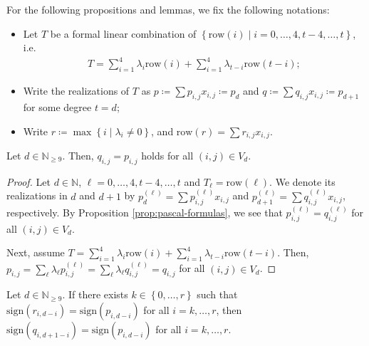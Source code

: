 For the following propositions and lemmas, we fix the following notations:
\begin{itemize}
    \item Let \( T \) be a formal linear combination of \( \left\{ \mathrm{row}(i) \mid i = 0, \dots, 4, t-4, \dots, t \right\} \), i.e. 
    \begin{align*}
        T = \sum_{i=1}^{4}  \lambda_{i} \mathrm{row}(i) + \sum_{i=1}^{4}  \lambda_{t-i} \mathrm{row}(t-i);
    \end{align*}
    \item Write the realizations of \( T \) as \( p \coloneqq \sum p_{i,j}x_{i,j}  \coloneqq p_d  \) and \( q \coloneqq \sum q_{i,j}x_{i,j} \coloneqq p_{d+1} \) for some degree \( t = d \);
    \item Write \( r \coloneqq \max\left\{ i \mid \lambda_i \neq 0 \right\} \), and \( \mathrm{row}(r) = \sum r_{i,j}x_{i,j} \).
\end{itemize}  

\begin{lemma}\label{prop:row_extend_d}
    Let \( d \in \mathbb{N}_{\geq 9} \). Then, \( q_{i,j} = p_{i,j} \) holds for all \( (i,j) \in V_d \).
  \end{lemma}
  
  \begin{proof}
    Let \( d \in \mathbb{N} \), \( \ell = 0, \dots, 4,t-4,\dots,t \) and \(T_{\ell} =  \mathrm{row}(\ell) \). We denote its realizations in \( d \) and \( d + 1 \) by \( p_d^{(\ell)} = \sum p_{i,j}^{(\ell)}x_{i,j} \) and \( p_{d+1}^{(\ell)} = \sum q_{i,j}^{(\ell)}x_{i,j} \), respectively. By Proposition \ref{prop:pascal-formulas}, we see that \( p_{i,j}^{(\ell)} = q_{i,j}^{(\ell)} \) for all \( (i,j) \in V_d \).
    
    Next, assume \( T =  \sum_{i=1}^{4}  \lambda_{i} \mathrm{row}(i) + \sum_{i=1}^{4}  \lambda_{t-i} \mathrm{row}(t-i)  \). Then, \( p_{i,j} = \sum_{\ell} \lambda_\ell p_{i,j}^{(\ell)} = \sum_{\ell} \lambda_\ell q_{i,j}^{(\ell)} = q_{i,j} \) for all \( (i,j) \in V_d \).
  \end{proof}
  
  
\begin{lemma}\label{lemma:sign_row_propagation}
    Let \( d \in \mathbb{N}_{\geq 9} \). If there exists \( k \in \left\{ 0, \dots, r \right\} \) such that $\mathrm{sign}(r_{i,d-i}) = \mathrm{sign}(p_{i,d-i})$ for all \( i = k, \dots, r \), then \( \mathrm{sign}(q_{i,d+1-i}) = \mathrm{sign}(p_{i,d-i}) \) for all \( i = k, \dots, r\).
\end{lemma}

